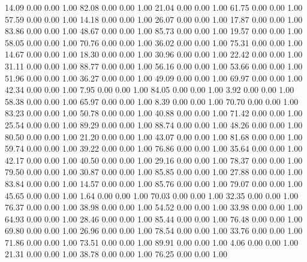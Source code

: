    14.09   0.00   0.00   1.00
   82.08   0.00   0.00   1.00
   21.04   0.00   0.00   1.00
   61.75   0.00   0.00   1.00
   57.59   0.00   0.00   1.00
   14.18   0.00   0.00   1.00
   26.07   0.00   0.00   1.00
   17.87   0.00   0.00   1.00
   83.86   0.00   0.00   1.00
   48.67   0.00   0.00   1.00
   85.73   0.00   0.00   1.00
   19.57   0.00   0.00   1.00
   58.05   0.00   0.00   1.00
   70.76   0.00   0.00   1.00
   36.02   0.00   0.00   1.00
   75.31   0.00   0.00   1.00
   14.67   0.00   0.00   1.00
   18.30   0.00   0.00   1.00
   30.96   0.00   0.00   1.00
   22.42   0.00   0.00   1.00
   31.11   0.00   0.00   1.00
   88.77   0.00   0.00   1.00
   56.16   0.00   0.00   1.00
   53.66   0.00   0.00   1.00
   51.96   0.00   0.00   1.00
   36.27   0.00   0.00   1.00
   49.09   0.00   0.00   1.00
   69.97   0.00   0.00   1.00
   42.34   0.00   0.00   1.00
    7.95   0.00   0.00   1.00
   84.05   0.00   0.00   1.00
    3.92   0.00   0.00   1.00
   58.38   0.00   0.00   1.00
   65.97   0.00   0.00   1.00
    8.39   0.00   0.00   1.00
   70.70   0.00   0.00   1.00
   83.23   0.00   0.00   1.00
   50.78   0.00   0.00   1.00
   40.88   0.00   0.00   1.00
   71.42   0.00   0.00   1.00
   25.54   0.00   0.00   1.00
   89.29   0.00   0.00   1.00
   88.74   0.00   0.00   1.00
   48.26   0.00   0.00   1.00
   80.50   0.00   0.00   1.00
   21.20   0.00   0.00   1.00
   43.07   0.00   0.00   1.00
   81.68   0.00   0.00   1.00
   59.74   0.00   0.00   1.00
   39.22   0.00   0.00   1.00
   76.86   0.00   0.00   1.00
   35.64   0.00   0.00   1.00
   42.17   0.00   0.00   1.00
   40.50   0.00   0.00   1.00
   29.16   0.00   0.00   1.00
   78.37   0.00   0.00   1.00
   79.50   0.00   0.00   1.00
   30.87   0.00   0.00   1.00
   85.85   0.00   0.00   1.00
   27.88   0.00   0.00   1.00
   83.84   0.00   0.00   1.00
   14.57   0.00   0.00   1.00
   85.76   0.00   0.00   1.00
   79.07   0.00   0.00   1.00
   45.65   0.00   0.00   1.00
    1.64   0.00   0.00   1.00
   70.03   0.00   0.00   1.00
   32.35   0.00   0.00   1.00
   76.37   0.00   0.00   1.00
   38.98   0.00   0.00   1.00
   54.52   0.00   0.00   1.00
   33.98   0.00   0.00   1.00
   64.93   0.00   0.00   1.00
   28.46   0.00   0.00   1.00
   85.44   0.00   0.00   1.00
   76.48   0.00   0.00   1.00
   69.80   0.00   0.00   1.00
   26.96   0.00   0.00   1.00
   78.54   0.00   0.00   1.00
   33.76   0.00   0.00   1.00
   71.86   0.00   0.00   1.00
   73.51   0.00   0.00   1.00
   89.91   0.00   0.00   1.00
    4.06   0.00   0.00   1.00
   21.31   0.00   0.00   1.00
   38.78   0.00   0.00   1.00
   76.25   0.00   0.00   1.00
